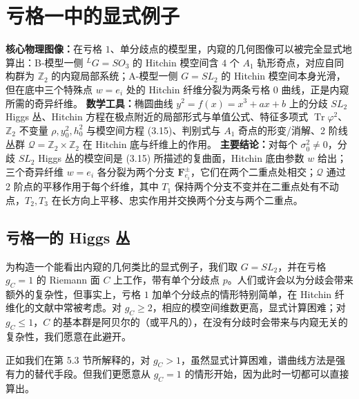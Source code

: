 

\section{亏格一中的显式例子}

\begin{keytakeaway}
\textbf{核心物理图像：}在亏格 $1$、单分歧点的模型里，内窥的几何图像可以被完全显式地算出：B-模型一侧 ${}^{L}G=SO_3$ 的 Hitchin 模空间含 $4$ 个 $A_1$ 轨形奇点，对应自同构群为 $\mathbb{Z}_2$ 的内窥局部系统；A-模型一侧 $G=SL_2$ 的 Hitchin 模空间本身光滑，但在底中三个特殊点 $w=e_i$ 处的 Hitchin 纤维分裂为两条亏格 $0$ 曲线，正是内窥所需的奇异纤维。
\textbf{数学工具：}椭圆曲线 $y^2=f(x)=x^3+ax+b$ 上的分歧 $SL_2$ Higgs 丛、Hitchin 方程在极点附近的局部形式与单值公式、特征多项式 $\operatorname{Tr}\varphi^2$、$\mathbb{Z}_2$ 不变量 $\rho,y_0^2,h_0^2$ 与模空间方程 (3.15)、判别式与 $A_1$ 奇点的形变/消解、2 阶线丛群 $\mathcal{Q}=\mathbb{Z}_2\times\mathbb{Z}_2$ 在 Hitchin 底与纤维上的作用。
\textbf{主要结论：}对每个 $\sigma_0^2\neq 0$，分歧 $SL_2$ Higgs 丛的模空间是 (3.15) 所描述的复曲面，Hitchin 底由参数 $w$ 给出；三个奇异纤维 $w=e_i$ 各分裂为两个分支 $\boldsymbol{F}_{e_i}^{\pm}$，它们在两个二重点处相交；$\mathcal{Q}$ 通过 2 阶点的平移作用于每个纤维，其中 $T_1$ 保持两个分支不变并在二重点处有不动点，$T_2,T_3$ 在长方向上平移、忠实作用并交换两个分支与两个二重点。
\end{keytakeaway}

\subsection{亏格一的 Higgs 丛}

为构造一个能看出内窥的几何类比的显式例子，我们取 $G=SL_2$，并在亏格 $g_C=1$ 的 Riemann 面 $C$ 上工作，带有单个分歧点 $p$。人们或许会以为分歧会带来额外的复杂性，但事实上，亏格 $1$ 加单个分歧点的情形特别简单，在 Hitchin 纤维化的文献中常被考虑。对 $g_C\ge 2$，相应的模空间维数更高，显式计算困难；对 $g_C\le 1$，$C$ 的基本群是阿贝尔的（或平凡的），在没有分歧时会带来与内窥无关的复杂性，我们愿意在此避开。

正如我们在第 5.3 节所解释的，对 $g_C>1$，虽然显式计算困难，谱曲线方法是强有力的替代手段。但我们更愿意从 $g_C=1$ 的情形开始，因为此时一切都可以直接算出。

